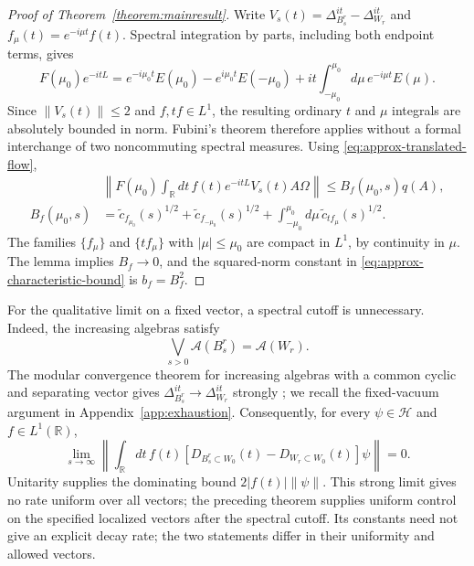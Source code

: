 \documentclass[a4paper,11pt]{article}
\theoremstyle{definition}
\begin{document}
\begin{proof}[Proof of Theorem~\ref{theorem:mainresult}]
Write $V_s(t)=\Delta_{B_s^r}^{it}-\Delta_{W_r}^{it}$ and $f_\mu(t)=e^{-i\mu t}f(t)$. Spectral integration by parts, including both endpoint terms, gives
\begin{equation}
 F(\mu_0)e^{-itL}
 =e^{-i\mu_0t}E(\mu_0)-e^{i\mu_0t}E(-\mu_0)
 +it\int_{-\mu_0}^{\mu_0}d\mu\,e^{-i\mu t}E(\mu).
 \label{eq:approx-spectral-parts}
\end{equation}
Since $\|V_s(t)\|\leq2$ and $f,tf\in L^1$, the resulting ordinary $t$ and $\mu$ integrals are absolutely bounded in norm. Fubini's theorem therefore applies without a formal interchange of two noncommuting spectral measures. Using \eqref{eq:approx-translated-flow},
\begin{align}
 &\left\|F(\mu_0)\int_{\mathbb R}dt\,f(t)e^{-itL}V_s(t)A\Omega\right\|
 \leq B_f(\mu_0,s)q(A),\nonumber\\
 B_f(\mu_0,s)
 &=\widetilde c_{f_{\mu_0}}(s)^{1/2}
 +\widetilde c_{f_{-\mu_0}}(s)^{1/2}
 +\int_{-\mu_0}^{\mu_0}d\mu\,\widetilde c_{tf_\mu}(s)^{1/2}.
 \label{eq:approx-bound-amplitude}
\end{align}
The families $\{f_\mu\}$ and $\{tf_\mu\}$ with $|\mu|\leq\mu_0$ are compact in $L^1$, by continuity in $\mu$. The lemma implies $B_f\to0$, and the squared-norm constant in \eqref{eq:approx-characteristic-bound} is $b_f=B_f^2$.
\end{proof}

For the qualitative limit on a fixed vector, a spectral cutoff is unnecessary. Indeed, the increasing algebras satisfy
\begin{equation}
 \bigvee_{s>0}\mathcal A(B_s^r)=\mathcal A(W_r).
\end{equation}
The modular convergence theorem for increasing algebras with a common cyclic and separating vector gives $\Delta_{B_s^r}^{it}\to\Delta_{W_r}^{it}$ strongly \cite{revolutionizing,takesaki2}; we recall the fixed-vacuum argument in Appendix~\ref{app:exhaustion}. Consequently, for every $\psi\in\mathcal H$ and $f\in L^1(\mathbb R)$,
\begin{equation}
 \lim_{s\to\infty}\left\|\int_{\mathbb R}dt\,f(t)
 [D_{B_s^r\subset W_0}(t)-D_{W_r\subset W_0}(t)]\psi\right\|=0.
 \label{eq:approx-uncut-wedge-limit}
\end{equation}
Unitarity supplies the dominating bound $2|f(t)|\|\psi\|$. This strong limit gives no rate uniform over all vectors; the preceding theorem supplies uniform control on the specified localized vectors after the spectral cutoff. Its constants need not give an explicit decay rate; the two statements differ in their uniformity and allowed vectors.
\end{document}
